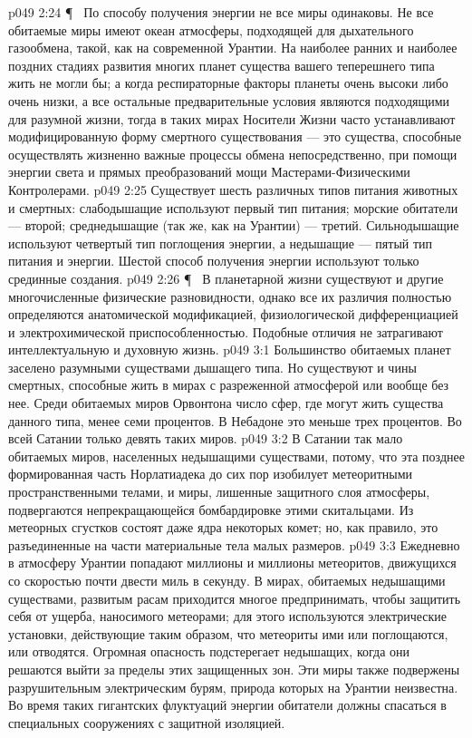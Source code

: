 \vs p049 2:24 \P\ \bibnobreakspace {} По способу получения энергии не все миры одинаковы. Не все обитаемые миры имеют океан атмосферы, подходящей для дыхательного газообмена, такой, как на современной Урантии. На наиболее ранних и наиболее поздних стадиях развития многих планет существа вашего теперешнего типа жить не могли бы; а когда респираторные факторы планеты очень высоки либо очень низки, а все остальные предварительные условия являются подходящими для разумной жизни, тогда в таких мирах Носители Жизни часто устанавливают модифицированную форму смертного существования --- это существа, способные осуществлять жизненно важные процессы обмена непосредственно, при помощи энергии света и прямых преобразований мощи Мастерами\hyp{}Физическими Контролерами.
\vs p049 2:25 Существует шесть различных типов питания животных и смертных: слабодышащие используют первый тип питания; морские обитатели --- второй; среднедышащие (так же, как на Урантии) --- третий. Сильнодышащие используют четвертый тип поглощения энергии, а недышащие --- пятый тип питания и энергии. Шестой способ получения энергии используют только срединные создания.
\vs p049 2:26 \P\ \bibnobreakspace {} В планетарной жизни существуют и другие многочисленные физические разновидности, однако все их различия полностью определяются анатомической модификацией, физиологической дифференциацией и электрохимической приспособленностью. Подобные отличия не затрагивают интеллектуальную и духовную жизнь.
\vs p049 3:1 Большинство обитаемых планет заселено разумными существами дышащего типа. Но существуют и чины смертных, способные жить в мирах с разреженной атмосферой или вообще без нее. Среди обитаемых миров Орвонтона число сфер, где могут жить существа данного типа, менее семи процентов. В Небадоне это меньше трех процентов. Во всей Сатании только девять таких миров.
\vs p049 3:2 В Сатании так мало обитаемых миров, населенных недышащими существами, потому, что эта позднее формированная часть Норлатиадека до сих пор изобилует метеоритными пространственными телами, и миры, лишенные защитного слоя атмосферы, подвергаются непрекращающейся бомбардировке этими скитальцами. Из метеорных сгустков состоят даже ядра некоторых комет; но, как правило, это разъединенные на части материальные тела малых размеров.
\vs p049 3:3 Ежедневно в атмосферу Урантии попадают миллионы и миллионы метеоритов, движущихся со скоростью почти двести миль в секунду. В мирах, обитаемых недышащими существами, развитым расам приходится многое предпринимать, чтобы защитить себя от ущерба, наносимого метеорами; для этого используются электрические установки, действующие таким образом, что метеориты ими или поглощаются, или отводятся. Огромная опасность подстерегает недышащих, когда они решаются выйти за пределы этих защищенных зон. Эти миры также подвержены разрушительным электрическим бурям, природа которых на Урантии неизвестна. Во время таких гигантских флуктуаций энергии обитатели должны спасаться в специальных сооружениях с защитной изоляцией.
